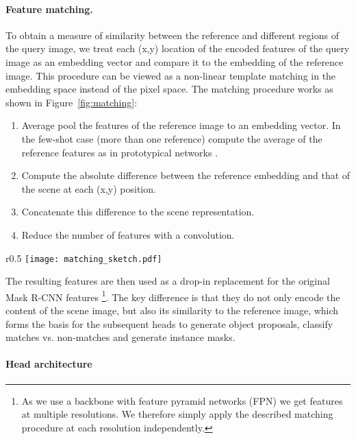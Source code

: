 \documentclass{article}
\begin{document}
\paragraph{Feature matching.}

To obtain a measure of similarity between the reference and different regions of the query image, we treat each (x,y) location of the encoded features of the query image as an embedding vector and compare it to the embedding of the reference image. This procedure can be viewed as a non-linear template matching in the embedding space instead of the pixel space. The matching procedure works as shown in Figure~\ref{fig:matching}:
\begin{enumerate}[nosep]
    \item Average pool the features of the reference image to an embedding vector. In the few-shot case (more than one reference) compute the average of the reference features as in prototypical networks \cite{Snell2017}.
    \item Compute the absolute difference between the reference embedding and that of the scene at each (x,y) position.
    \item Concatenate this difference to the scene representation.
    \item Reduce the number of features with a  convolution.
\end{enumerate}

\begin{wrapfigure}[7]{r}{0.5\textwidth}
    \vspace{-3.5mm}
    \texttt{[image: matching\_sketch.pdf]}
    \caption{Sketch of the matching procedure. }
    \label{fig:matching}
\end{wrapfigure}

The resulting features are then used as a drop-in replacement for the original Mask R-CNN features \footnote{As we use  a backbone with feature pyramid networks (FPN) we get features at multiple resolutions. We therefore simply apply the described matching procedure at each resolution independently.}. The key difference is that they do not only encode the content of the scene image, but also its similarity to the reference image, which forms the basis for the subsequent heads to generate object proposals, classify matches vs. non-matches and generate instance masks.


\paragraph{Head architecture}
\end{document}
